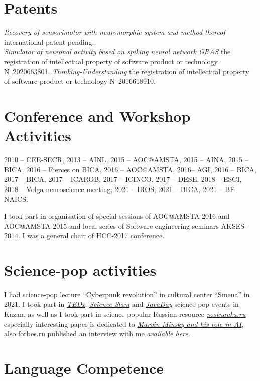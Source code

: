 \documentclass{moderncv}
\begin{document}
    \section{Patents}
    \emph{Recovery of sensorimotor with neuromorphic system and method thereof} international patent pending.\\
    \emph{Simulator of neuronal activity based on spiking neural network GRAS} the registration of intellectual property of software product or technology N~2020663801.
    \emph{Thinking-Understanding} the registration of intellectual property of software product or technology N~2016618910.\\
    
    
    \section{Conference and Workshop Activities}
    2010 -- CEE-SECR, 2013 -- AINL, 2015 -- AOC@AMSTA, 2015 -- AINA, 2015 -- BICA, 2016 -- Fierces on BICA, 2016 -- AOC@AMSTA, 2016-- AGI, 2016 -- BICA, 2017 -- BICA, 2017 -- ICAROB, 2017 -- ICINCO, 2017 -- DESE, 2018 -- ESCI, 2018 -- Volga neuroscience meeting, 2021 -- IROS, 2021 -- BICA, 2021 -- BF-NAICS.

    I took part in organisation of special sessions of AOC@AMSTA-2016 and AOC@AMSTA-2015 and local series of Software engineering seminars AKSES-2014. I was a general chair of HCC-2017 conference.

    \section{Science-pop activities}
    I had science-pop lecture ``Cyberpunk revolution'' in cultural center ``Smena'' in 2021.
    I took part in \href{https://www.youtube.com/watch?v=BLvS7h3kRbo}{\emph{TEDx}}, \href{https://vk.com/video-87488544_171504962}{\emph{Science Slam}} and \href{https://www.youtube.com/watch?v=sLLKxvUEA7E}{\emph{JavaDay}} science-pop events in Kazan, as well as I took part in science popular Russian resource \href{https://postnauka.ru/author/talanov}{\emph{postnauka.ru}} especially interesting paper is dedicated to \href{https://postnauka.ru/faq/58727}{\emph{Marvin Minsky and his role in AI}}, also forbes.ru published an interview with me \href{http://www.forbes.ru/mneniya-column/288097-kak-sozdat-emotsionalnyi-iskusstvennyi-intellekt}{\emph{available here}}.

    \section{Language Competence}
\end{document}
